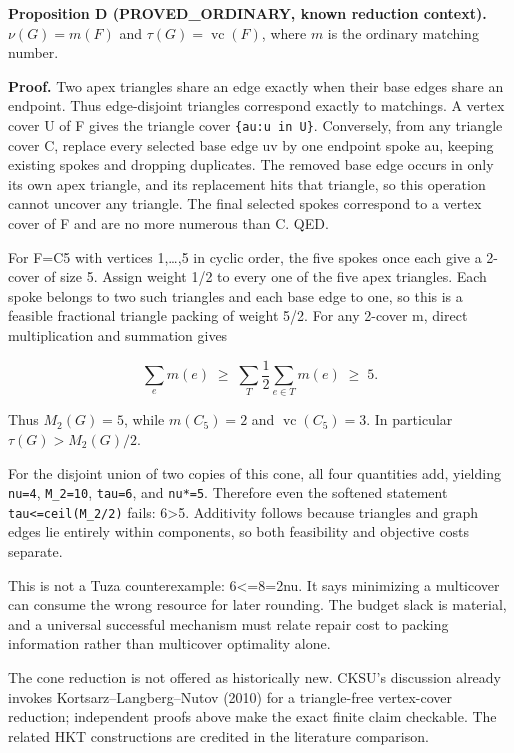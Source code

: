 \documentclass[11pt]{article}
\begin{document}
\textbf{Proposition D (PROVED\_ORDINARY, known reduction context).} \(\nu(G)=m(F)\) and \(\tau(G)=\operatorname{vc}(F)\), where \(m\) is the ordinary matching number.

\textbf{Proof.} Two apex triangles share an edge exactly when their base edges share an endpoint. Thus edge-disjoint triangles correspond exactly to matchings. A vertex cover U of F gives the triangle cover \texttt{\{au:u\ in\ U\}}. Conversely, from any triangle cover C, replace every selected base edge uv by one endpoint spoke au, keeping existing spokes and dropping duplicates. The removed base edge occurs in only its own apex triangle, and its replacement hits that triangle, so this operation cannot uncover any triangle. The final selected spokes correspond to a vertex cover of F and are no more numerous than C. QED.

For F=C5 with vertices 1,\ldots,5 in cyclic order, the five spokes once each give a 2-cover of size 5. Assign weight 1/2 to every one of the five apex triangles. Each spoke belongs to two such triangles and each base edge to one, so this is a feasible fractional triangle packing of weight 5/2. For any 2-cover m, direct multiplication and summation gives

\[\sum_e m(e)\;\ge\;\sum_T\frac12\sum_{e\in T}m(e)\;\ge\;5.\]

Thus \(M_2(G)=5\), while \(m(C_5)=2\) and \(\operatorname{vc}(C_5)=3\). In particular \(\tau(G)>M_2(G)/2\).

For the disjoint union of two copies of this cone, all four quantities add, yielding \texttt{nu=4}, \texttt{M\_2=10}, \texttt{tau=6}, and \texttt{nu*=5}. Therefore even the softened statement \texttt{tau\textless{}=ceil(M\_2/2)} fails: 6\textgreater5. Additivity follows because triangles and graph edges lie entirely within components, so both feasibility and objective costs separate.

This is not a Tuza counterexample: 6\textless=8=2nu. It says minimizing a multicover can consume the wrong resource for later rounding. The budget slack is material, and a universal successful mechanism must relate repair cost to packing information rather than multicover optimality alone.

The cone reduction is not offered as historically new. CKSU's discussion already invokes Kortsarz--Langberg--Nutov (2010) for a triangle-free vertex-cover reduction; independent proofs above make the exact finite claim checkable. The related HKT constructions are credited in the literature comparison.
\end{document}
